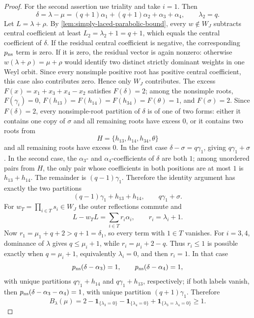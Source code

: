\documentclass[11pt]{article}
\theoremstyle{definition}
\theoremstyle{remark}
\begin{document}
\begin{proof}
For the second assertion use triality and take $i=1$.  Then
\[
 \delta=\lambda-\mu
   =(q+1)\alpha_1+(q+1)\alpha_2+\alpha_3+\alpha_4,
 \qquad \lambda_2=q.
\]
Let $L=\lambda+\rho$.  By \cref{lem:simply-laced-parabolic-bound}, every
$w\notin W_J$ subtracts central coefficient at least
$L_2=\lambda_2+1=q+1$, which equals the central coefficient of $\delta$.
If the residual central coefficient is negative, the corresponding
$p_{\rm ns}$ term is zero.  If it is zero, the residual vector is again
nonzero: otherwise $w(\lambda+\rho)=\mu+\rho$ would identify two distinct
strictly dominant weights in one Weyl orbit.  Since every nonsimple positive
root has positive central coefficient, this case also contributes zero.
Hence only $W_J$ contributes.  The excess
$F(x)=x_1+x_3+x_4-x_2$ satisfies $F(\delta)=2$; among the nonsimple roots,
$F(\gamma_i)=0$, $F(h_{13})=F(h_{14})=F(h_{34})=F(\theta)=1$, and
$F(\sigma)=2$.  Since $F(\delta)=2$, every nonsimple-root partition of $\delta$ is of one
of two forms: either it contains one copy of $\sigma$ and all remaining roots
have excess $0$, or it contains two roots from
\[
 H=\{h_{13},h_{14},h_{34},\theta\}
\]
and all remaining roots have excess $0$.  In the first case
$\delta-\sigma=q\gamma_1$, giving $q\gamma_1+\sigma$.  In the second case,
the $\alpha_3$- and $\alpha_4$-coefficients of $\delta$ are both $1$; among
unordered pairs from $H$, the only pair whose coefficients in both positions
are at most $1$ is $h_{13}+h_{14}$.  The remainder is
$(q-1)\gamma_1$.  Therefore the identity argument has exactly the two
partitions
\[
 (q-1)\gamma_1+h_{13}+h_{14},
 \qquad
 q\gamma_1+\sigma.
\]
For $w_T=\prod_{i\in T}s_i\in W_J$ the outer reflections commute and
\[
 L-w_TL=\sum_{i\in T}r_i\alpha_i,
 \qquad r_i=\lambda_i+1.
\]
Now $r_1=\mu_1+q+2>q+1=\delta_1$, so every term with $1\in T$ vanishes.  For
$i=3,4$, dominance of $\lambda$ gives $q\le\mu_i+1$, while
$r_i=\mu_i+2-q$.  Thus $r_i\le1$ is possible exactly when
$q=\mu_i+1$, equivalently $\lambda_i=0$, and then $r_i=1$.  In that case
\[
 p_{\rm ns}(\delta-\alpha_3)=1,
 \qquad
 p_{\rm ns}(\delta-\alpha_4)=1,
\]
with unique partitions $q\gamma_1+h_{14}$ and $q\gamma_1+h_{13}$,
respectively; if both labels vanish, then
$p_{\rm ns}(\delta-\alpha_3-\alpha_4)=1$, with unique partition
$(q+1)\gamma_1$.  Therefore
\[
 B_\lambda(\mu)
 =2-\mathbf 1_{\{\lambda_3=0\}}
    -\mathbf 1_{\{\lambda_4=0\}}
    +\mathbf 1_{\{\lambda_3=\lambda_4=0\}}
 \ge1.
\]


\end{proof}
\end{document}
